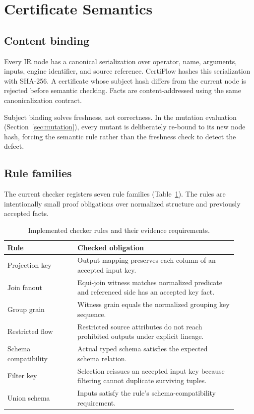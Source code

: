 \section{Certificate Semantics}

\subsection{Content binding}

Every IR node has a canonical serialization over operator, name, arguments, inputs, engine identifier, and source reference. CertiFlow hashes this serialization with SHA-256. A certificate whose subject hash differs from the current node is rejected before semantic checking. Facts are content-addressed using the same canonicalization contract.

Subject binding solves freshness, not correctness. In the mutation evaluation (Section~\ref{sec:mutation}), every mutant is deliberately re-bound to its new node hash, forcing the semantic rule rather than the freshness check to detect the defect.

\subsection{Rule families}

The current checker registers seven rule families (Table~\ref{tab:rules}). The rules are intentionally small proof obligations over normalized structure and previously accepted facts.

\begin{table}[t]
\caption{Implemented checker rules and their evidence requirements.}
\label{tab:rules}
\small
\begin{tabular}{p{0.28\linewidth}p{0.64\linewidth}}
\toprule
Rule & Checked obligation \\
\midrule
Projection key & Output mapping preserves each column of an accepted input key. \\
Join fanout & Equi-join witness matches normalized predicate and referenced side has an accepted key fact. \\
Group grain & Witness grain equals the normalized grouping key sequence. \\
Restricted flow & Restricted source attributes do not reach prohibited outputs under explicit lineage. \\
Schema compatibility & Actual typed schema satisfies the expected schema relation. \\
Filter key & Selection reissues an accepted input key because filtering cannot duplicate surviving tuples. \\
Union schema & Inputs satisfy the rule's schema-compatibility requirement. \\
\bottomrule
\end{tabular}
\end{table}

